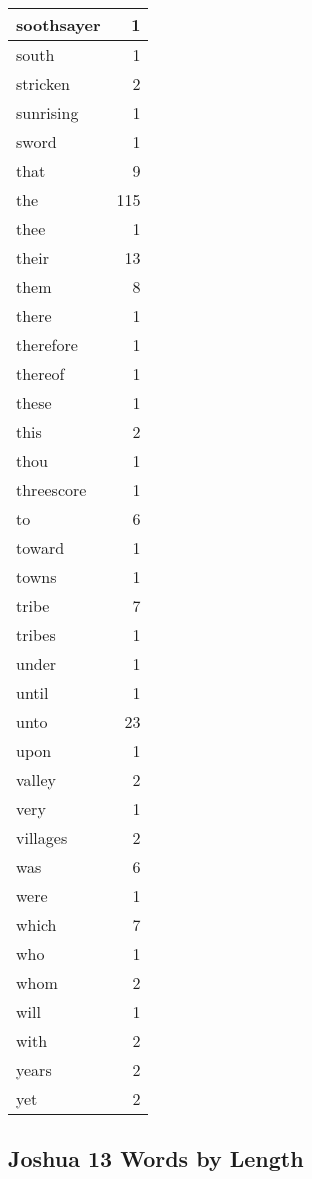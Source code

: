 \begin{center}
\begin{longtable}{l|r}
soothsayer & 1\\ \hline 
south & 1\\ \hline 
stricken & 2\\ \hline 
sunrising & 1\\ \hline 
sword & 1\\ \hline 
that & 9\\ \hline 
the & 115\\ \hline 
thee & 1\\ \hline 
their & 13\\ \hline 
them & 8\\ \hline 
there & 1\\ \hline 
therefore & 1\\ \hline 
thereof & 1\\ \hline 
these & 1\\ \hline 
this & 2\\ \hline 
thou & 1\\ \hline 
threescore & 1\\ \hline 
to & 6\\ \hline 
toward & 1\\ \hline 
towns & 1\\ \hline 
tribe & 7\\ \hline 
tribes & 1\\ \hline 
under & 1\\ \hline 
until & 1\\ \hline 
unto & 23\\ \hline 
upon & 1\\ \hline 
valley & 2\\ \hline 
very & 1\\ \hline 
villages & 2\\ \hline 
was & 6\\ \hline 
were & 1\\ \hline 
which & 7\\ \hline 
who & 1\\ \hline 
whom & 2\\ \hline 
will & 1\\ \hline 
with & 2\\ \hline 
years & 2\\ \hline 
yet & 2\\ \hline 
\end{longtable}
\end{center}





\subsection{Joshua 13 Words by Length}


